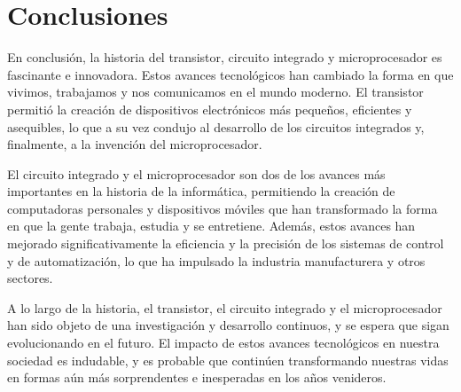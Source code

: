 \documentclass{article}
\begin{document}
\section*{Conclusiones}

En conclusión, la historia del transistor, circuito integrado y microprocesador es fascinante e innovadora. 
Estos avances tecnológicos han cambiado la forma en que vivimos, trabajamos y nos comunicamos en el mundo moderno. 
El transistor permitió la creación de dispositivos electrónicos más pequeños, eficientes y asequibles, 
lo que a su vez condujo al desarrollo de los circuitos integrados y, finalmente, a la invención del microprocesador.

El circuito integrado y el microprocesador son dos de los avances más importantes en la historia de la informática, 
permitiendo la creación de computadoras personales y dispositivos móviles que han transformado la forma en que la gente trabaja, 
estudia y se entretiene. Además, estos avances han mejorado significativamente la eficiencia y la precisión de los sistemas de control 
y de automatización, lo que ha impulsado la industria manufacturera y otros sectores.

A lo largo de la historia, el transistor, el circuito integrado y el microprocesador han sido objeto de una investigación 
y desarrollo continuos, y se espera que sigan evolucionando en el futuro. El impacto de estos avances tecnológicos 
en nuestra sociedad es indudable, y es probable que continúen transformando nuestras vidas 
en formas aún más sorprendentes e inesperadas en los años venideros.




\end{document}
